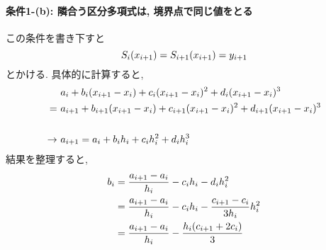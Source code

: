 \paragraph{条件1-(b): 隣合う区分多項式は, 境界点で同じ値をとる}
この条件を書き下すと
\begin{equation}
    S_{i}(x_{i+1}) = S_{i+1}(x_{i+1}) = y_{i+1}
    \notag
\end{equation}
とかける. 具体的に計算すると,
\begin{align}
    &
    a_{i} + b_{i} (x_{i+1} - x_{i}) +
    c_{i} (x_{i+1} - x_{i})^{2} + d_{i} (x_{i+1} - x_{i})^{3}
    \notag \\ =~
    &
    a_{i+1} + b_{i+1} (x_{i+1} - x_{i}) +
    c_{i+1} (x_{i+1} - x_{i})^{2} + d_{i+1} (x_{i+1} - x_{i})^{3}
    \notag \\
    \notag \\
    \to~
    &
    a_{i+1} = a_{i} + b_{i} h_{i} + c_{i} h_{i}^{2} + d_{i} h_{i}^{3}
    \notag
\end{align}
結果を整理すると, 
\begin{align}
    b_{i}
    &=
    \frac{a_{i+1} - a_{i}}{h_{i}} - c_{i} h_{i} - d_{i} h_{i}^{2}
    \notag \\
    &=
    \frac{a_{i+1} - a_{i}}{h_{i}} - c_{i} h_{i} -
    \frac{c_{i+1} - c_{i}}{3 h_{i}} h_{i}^{2}
    \notag \\
    &=
    \frac{a_{i+1} - a_{i}}{h_{i}} -
    \frac{h_{i}(c_{i+1} + 2c_{i})}{3}
\end{align}

